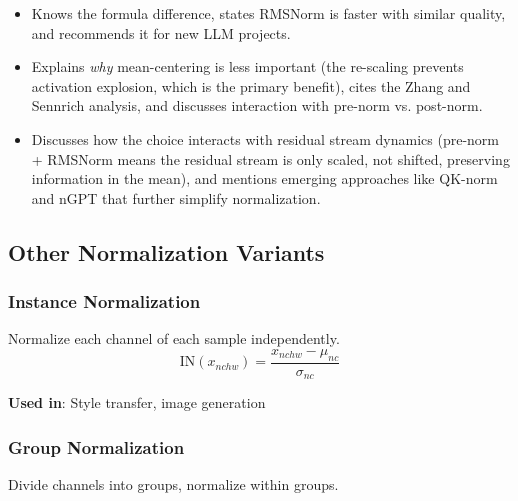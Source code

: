 \begin{interviewq}

\goodgreat
\begin{itemize}
    \item {} Knows the formula difference, states RMSNorm is faster with similar quality, and recommends it for new LLM projects.
    \item {} Explains \textit{why} mean-centering is less important (the re-scaling prevents activation explosion, which is the primary benefit), cites the Zhang and Sennrich analysis, and discusses interaction with pre-norm vs. post-norm.
    \item {} Discusses how the choice interacts with residual stream dynamics (pre-norm + RMSNorm means the residual stream is only scaled, not shifted, preserving information in the mean), and mentions emerging approaches like QK-norm and nGPT that further simplify normalization.
\end{itemize}

\end{interviewq}

\subsection{Other Normalization Variants}

\subsubsection{Instance Normalization}

Normalize each channel of each sample independently.
\begin{equation}
\text{IN}(x_{nchw}) = \frac{x_{nchw} - \mu_{nc}}{\sigma_{nc}}
\end{equation}

\textbf{Used in}: Style transfer, image generation

\subsubsection{Group Normalization}

Divide channels into groups, normalize within groups.

